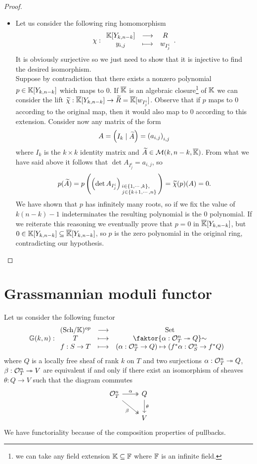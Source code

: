 \begin{proof}
\begin{itemize}
\item Let us consider the following ring homomorphism
\[\chi:\begin{array}{ccc} {\mathbb{K}[Y_{k,n-k}]} & \longrightarrow & {R}\\ {y_{i,j}} & \longmapsto & {w_{I^i_j}} \end{array}.\]
It is obviously surjective so we just need to show that it is injective to find the desired isomorphism.\\
Suppose by contradiction that there exists a nonzero polynomial $p\in \mathbb{K}[Y_{k,n-k}]$ which maps to $0$. If $\overline{\mathbb{K}}$ is an algebraic closure\footnote{we can take any field extension $\mathbb{K}\subseteq \mathbb{F}$ where $\mathbb{F}$ is an infinite field.} of $\mathbb{K}$ we can consider the lift $\widetilde{\chi}:\overline{\mathbb{K}}[Y_{k,n-k}]\to \widetilde{R}=\overline{\mathbb{K}}[w_{I^i_j}]$. Observe that if $p$ maps to $0$ according to the original map, then it would also map to $0$ according to this extension. Consider now any matrix of the form
\[A=\begin{pmatrix}I_k\mid \widetilde{A}\end{pmatrix}=\left({a_{i,j}}\right)_{i,j}\]
where $I_k$ is the $k\times k$ identity matrix and $\widetilde{A}\in \mathcal{M}(k,n-k,\overline{\mathbb{K}})$. From what we have said above it follows that $\det A_{I^i_j}=a_{i,j}$, so \[p(\widetilde{A})=p\left({\left({\det A_{I^i_j}}\right)_{\begin{smallmatrix}i\in\left\{{1,\cdots, k}\right\},~~~\\ j\in \left\{{k+1,\cdots, n}\right\}\end{smallmatrix}}}\right)=\widetilde{\chi}(p)(A)=0.\] We have shown that $p$ has infinitely many roots, so if we fix the value of $k(n-k)-1$ indeterminates the resulting polynomial is the $0$ polynomial. If we reiterate this reasoning we eventually prove that $p=0$ in $\overline{\mathbb{K}}[Y_{k,n-k}]$, but $0\in \mathbb{K}[Y_{k,n-k}]\subseteq \overline{\mathbb{K}}[Y_{k,n-k}]$, so $p$ is the zero polynomial in the original ring, contradicting our hypothesis.
\end{itemize}
\setlength{\leftmargini}{0.5cm}
\end{proof}



















\section{Grassmannian moduli functor}

Let us consider the following functor
\[\G(k,n):\functorDef{(\Sch\K)\op}{\Set}{T}{\quot{\cpa{\al:\Oc_T^n\onto Q}}\sim}{f:S\to T}{(\al:\Oc_T^n\to Q)\mapsto (f^\ast\al:\Oc_S^n\to f^\ast Q)}\]
where $Q$ is a locally free sheaf of rank $k$ on $T$ and two surjections $\alpha:\mathcal{O}_T^n\twoheadrightarrow Q$, $\beta:\mathcal{O}_T^n\twoheadrightarrow V$ are equivalent if and only if there exist an isomorphism of sheaves $\theta:Q\to V$ such that the diagram commutes
\[\begin{tikzcd}
	{\Oc_T^n} & Q \\
	& V
	\arrow["\al", two heads, from=1-1, to=1-2]
	\arrow["\beta"', two heads, from=1-1, to=2-2]
	\arrow["\theta", from=1-2, to=2-2]
\end{tikzcd}\]
We have functoriality because of the composition properties of pullbacks.

